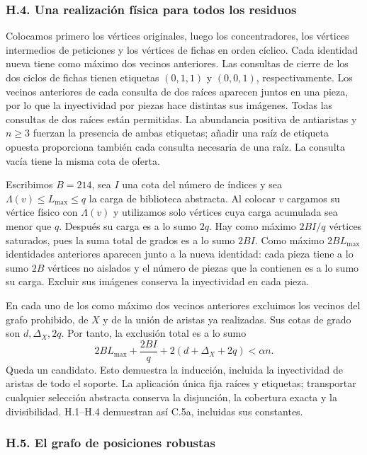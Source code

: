 \documentclass[spanish,11pt,a4paper]{article}
\begin{document}
\subsubsection{H.4. Una realización física para todos los residuos}\label{h.4.-una-realizaciuxf3n-fuxedsica-para-todos-los-residuos}

Colocamos primero los vértices originales, luego los concentradores, los vértices intermedios de peticiones y los vértices de fichas en orden cíclico. Cada identidad nueva tiene como máximo dos vecinos anteriores. Las consultas de cierre de los dos ciclos de fichas tienen etiquetas \((0,1,1)\) y \((0,0,1)\), respectivamente. Los vecinos anteriores de cada consulta de dos raíces aparecen juntos en una pieza, por lo que la inyectividad por piezas hace distintas sus imágenes. Todas las consultas de dos raíces están permitidas. La abundancia positiva de antiaristas y \(n\ge3\) fuerzan la presencia de ambas etiquetas; añadir una raíz de etiqueta opuesta proporciona también cada consulta necesaria de una raíz. La consulta vacía tiene la misma cota de oferta.

Escribimos \(B=214\), sea \(I\) una cota del número de índices y sea \(\Lambda(v)\le L_{\max}\le q\) la carga de biblioteca abstracta. Al colocar \(v\) cargamos su vértice físico con \(\Lambda(v)\) y utilizamos solo vértices cuya carga acumulada sea menor que \(q\). Después su carga es a lo sumo \(2q\). Hay como máximo \(2BI/q\) vértices saturados, pues la suma total de grados es a lo sumo \(2BI\). Como máximo \(2BL_{\max}\) identidades anteriores aparecen junto a la nueva identidad: cada pieza tiene a lo sumo \(2B\) vértices no aislados y el número de piezas que la contienen es a lo sumo su carga. Excluir sus imágenes conserva la inyectividad en cada pieza.

En cada uno de los como máximo dos vecinos anteriores excluimos los vecinos del grafo prohibido, de \(X\) y de la unión de aristas ya realizadas. Sus cotas de grado son \(d,\Delta_X,2q\). Por tanto, la exclusión total es a lo sumo \[2BL_{\max}+\frac{2BI}{q}+2(d+\Delta_X+2q)<\alpha n.\] Queda un candidato. Esto demuestra la inducción, incluida la inyectividad de aristas de todo el soporte. La aplicación única fija raíces y etiquetas; transportar cualquier selección abstracta conserva la disjunción, la cobertura exacta y la divisibilidad. H.1--H.4 demuestran así C.5a, incluidas sus constantes.

\subsubsection{H.5. El grafo de posiciones robustas}\label{h.5.-el-grafo-de-posiciones-robustas}
\end{document}
